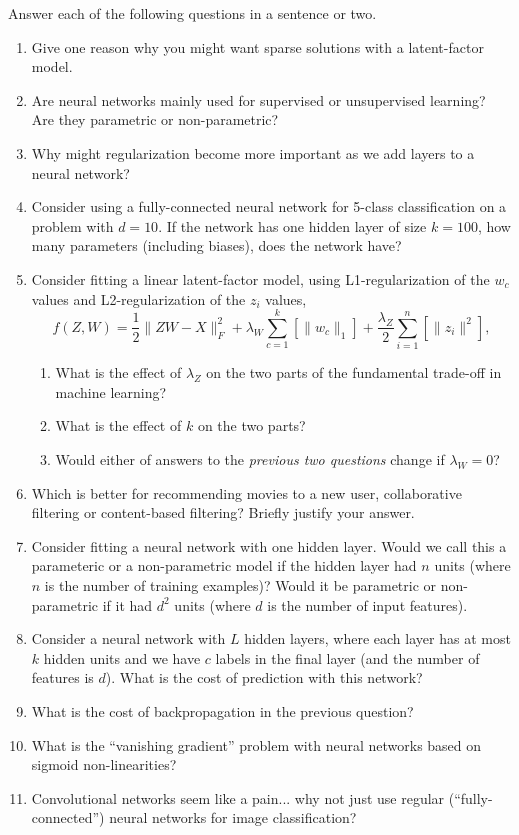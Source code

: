\documentclass{article}
\newcommand{\blu}[1]{{\textcolor{blu}{#1}}}
\let\ask\blu
\newcommand{\norm}[1]{\lVert #1 \rVert}
\begin{document}
\ask{Answer each of the following questions in a sentence or two.}
\begin{enumerate}

\item Give one reason why you might want sparse solutions with a latent-factor model.
\item{Are neural networks mainly used for supervised or unsupervised learning? Are they parametric or non-parametric?}
\item{Why might regularization become more important as we add layers to a neural network?}
\item{Consider using a fully-connected neural network for 5-class classification on a problem with $d=10$. If the network has one hidden layer of size $k=100$, how many parameters (including biases), does the network have?}
\item Consider fitting a linear latent-factor model, using L1-regularization of the $w_c$ values and L2-regularization of the $z_i$ values,
\[
f(Z,W) = \frac{1}{2}\norm{ZW - X}_F^2 + \lambda_W \sum_{c=1}^k \left[\norm{w_c}_1\right] + \frac{\lambda_Z}{2} \sum_{i=1}^n \left[\norm{z_i}^2\right],
\]
\begin{enumerate}
\item What is the effect of $\lambda_Z$ on the two parts of the fundamental trade-off in machine learning? 
\item What is the effect of $k$ on the two parts?
\item Would either of answers to the \emph{previous two questions} change if $\lambda_W = 0$?
\end{enumerate}
\item Which is better for recommending movies to a new user, collaborative filtering or content-based filtering? Briefly justify your answer.
\item Consider fitting a neural network with one hidden layer. Would we call this a parameteric or a non-parametric model if the hidden layer had $n$ units (where $n$ is the number of training examples)? Would it be parametric or non-parametric if it had $d^2$ units (where $d$ is the number of input features).
\item Consider a neural network with $L$ hidden layers, where each layer has at most $k$ hidden units and we have $c$ labels in the final layer (and the number of features is $d$). What is the cost of prediction with this network?
\item What is the cost of backpropagation in the previous question?
\item What is the ``vanishing gradient'' problem with neural networks based on sigmoid non-linearities?
\item Convolutional networks seem like a pain... why not just use regular (``fully-connected'') neural networks for image classification?

\end{enumerate}
\end{document}
